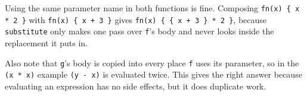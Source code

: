 \begin{blocksection}
\begin{questionmeta}
  Using the same parameter name in both functions is fine. Composing \lstinline|fn(x) { x * 2 }| with \lstinline|fn(x) { x + 3 }| gives \lstinline|fn(x) { { x + 3 } * 2 }|, because \texttt{substitute} only makes one pass over \texttt{f}'s body and never looks inside the replacement it puts in.

  Also note that \texttt{g}'s body is copied into every place \texttt{f} uses its parameter, so in the \texttt{(x * x)} example \lstinline{(y - x)} is evaluated twice. This gives the right answer because evaluating an expression has no side effects, but it does duplicate work.
\end{questionmeta}
\end{blocksection}